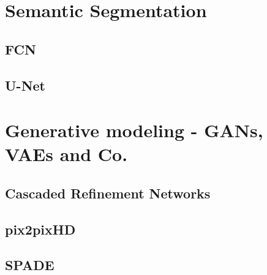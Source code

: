 \section{Semantic Segmentation} %
\subsection{FCN}
\subsection{U-Net} %
\section{Generative modeling - GANs, VAEs and Co.} 
\subsection{Cascaded Refinement Networks}
\subsection{pix2pixHD} 
\subsection{SPADE} 